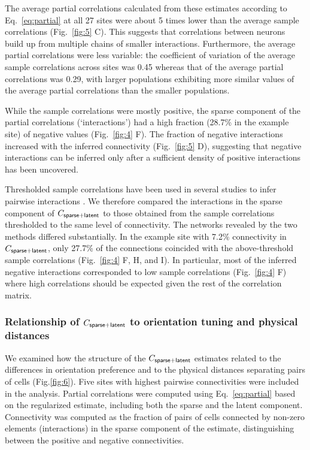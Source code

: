 The average partial correlations calculated from these estimates according to Eq.~\ref{eq:partial} at all 27 sites were about 5 times lower than the average sample correlations (Fig.~\ref{fig:5} C). This suggests that correlations between neurons build up from multiple chains of smaller interactions. Furthermore, the average partial correlations were less variable: the coefficient of variation of the average sample correlations across sites was 0.45 whereas that of the average partial correlations was 0.29, with larger populations exhibiting more similar values of the average partial correlations than the smaller populations.

While the sample correlations were mostly positive, the sparse component of the partial correlations (`interactions') had a high fraction (28.7\% in the example site) of negative values (Fig.~\ref{fig:4} F). The fraction of negative interactions increased with the inferred connectivity (Fig.~\ref{fig:5} D), suggesting that negative interactions can be inferred only after a sufficient density of positive interactions has been uncovered.

Thresholded sample correlations have been used in several studies to infer pairwise interactions \cite{Golshani:2009, Feldt:2011, Malmersjo:2013, Sadovsky:2014}.  We therefore compared the interactions in the sparse component of $C_{\sf sparse+latent}$ to those obtained from the sample correlations thresholded to the same level of connectivity. The networks revealed by the two methods differed substantially. In the example site with 7.2\% connectivity in $C_{\sf sparse+latent}$, only 27.7\% of the connections coincided with the above-threshold sample correlations (Fig.~\ref{fig:4} F, H, and I). In particular, most of the inferred negative interactions corresponded to low sample correlations (Fig.~\ref{fig:4} F) where high correlations should be expected given the rest of the correlation matrix.

\subsubsection*{Relationship of $C_{\sf sparse+latent}$ to orientation tuning and physical distances}

We examined how the structure of the $C_{\sf sparse+latent}$ estimates related to the differences in orientation preference and to the physical distances separating pairs of cells (Fig.\;\ref{fig:6}).  Five sites with highest pairwise connectivities were included in the analysis. Partial correlations were computed using Eq.~\ref{eq:partial} based on the regularized estimate, including both the sparse and the latent component. Connectivity was computed as the fraction of pairs of cells connected by non-zero elements (interactions) in the sparse component of the estimate, distinguishing between the positive and negative connectivities.

